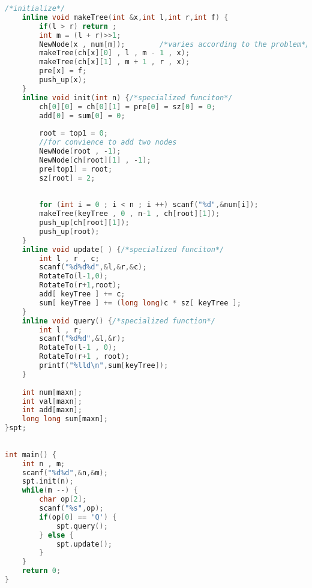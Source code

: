 \begin{lstlisting}[language=C++]
	/*initialize*/
	inline void makeTree(int &x,int l,int r,int f) {
		if(l > r) return ;
		int m = (l + r)>>1;
		NewNode(x , num[m]);		/*varies according to the problem*/
		makeTree(ch[x][0] , l , m - 1 , x);
		makeTree(ch[x][1] , m + 1 , r , x);
		pre[x] = f;
		push_up(x);
	}
	inline void init(int n) {/*specialized funciton*/
		ch[0][0] = ch[0][1] = pre[0] = sz[0] = 0;
		add[0] = sum[0] = 0;
 
		root = top1 = 0;
		//for convience to add two nodes
		NewNode(root , -1);
		NewNode(ch[root][1] , -1);
		pre[top1] = root;
		sz[root] = 2;
 
 
		for (int i = 0 ; i < n ; i ++) scanf("%d",&num[i]);
		makeTree(keyTree , 0 , n-1 , ch[root][1]);
		push_up(ch[root][1]);
		push_up(root);
	}
	inline void update( ) {/*specialized funciton*/
		int l , r , c;
		scanf("%d%d%d",&l,&r,&c);
		RotateTo(l-1,0);
		RotateTo(r+1,root);
		add[ keyTree ] += c;
		sum[ keyTree ] += (long long)c * sz[ keyTree ];
	}
	inline void query() {/*specialized function*/
		int l , r;
		scanf("%d%d",&l,&r);
		RotateTo(l-1 , 0);
		RotateTo(r+1 , root);
		printf("%lld\n",sum[keyTree]);
	}
 
	int num[maxn];
	int val[maxn];
	int add[maxn];
	long long sum[maxn];
}spt;
 
 
int main() {
	int n , m;
	scanf("%d%d",&n,&m);
	spt.init(n);
	while(m --) {
		char op[2];
		scanf("%s",op);
		if(op[0] == 'Q') {
			spt.query();
		} else {
			spt.update();
		}
	}
	return 0;
}
  \end{lstlisting}










\endinput